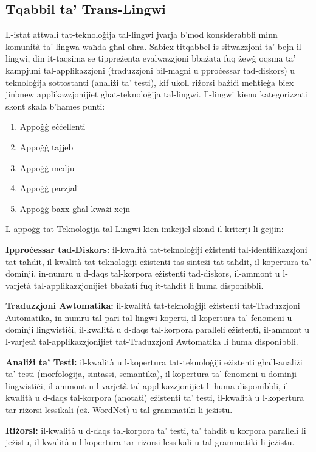 \documentclass[]{../../metanetpaper}
\begin{document}
\begin{multicols}{2}
\subsection{Tqabbil ta’ Trans-Lingwi }

L-istat attwali tat-teknoloġija tal-lingwi jvarja b’mod konsiderabbli minn komunità ta’ lingwa waħda għal oħra. Sabiex titqabbel is-sitwazzjoni ta’ bejn il-lingwi, din it-taqsima se tippreżenta evalwazzjoni bbażata fuq żewġ oqsma ta’ kampjuni tal-applikazzjoni (traduzzjoni bil-magni u pproċessar tad-diskors) u teknoloġija sottostanti (analiżi ta’ testi), kif ukoll riżorsi bażiċi meħtieġa biex jinbnew applikazzjonijiet għat-teknoloġija tal-lingwi. 
Il-lingwi kienu kategorizzati skont skala b'ħames punti:

\begin{enumerate}
\item Appoġġ eċċellenti
\item Appoġġ tajjeb
\item Appoġġ medju
\item Appoġġ parzjali
\item Appoġġ baxx għal kważi xejn
\end{enumerate}

L-appoġġ tat-Teknoloġija tal-Lingwi kien imkejjel skond il-kriterji li ġejjin:

\textbf{Ipproċessar tad-Diskors:} il-kwalità tat-teknoloġiji eżistenti tal-identifikazzjoni tat-taħdit, il-kwalità tat-teknoloġiji eżistenti tas-sinteżi tat-taħdit, il-kopertura ta' dominji, in-numru u d-daqs tal-korpora eżistenti tad-diskors, il-ammont u l-varjetà tal-applikazzjonijiet bbażati fuq it-taħdit li huma disponibbli.

\textbf{Traduzzjoni Awtomatika:} il-kwalità tat-teknoloġiji eżistenti tat-Traduzzjoni Automatika, in-numru tal-pari tal-lingwi koperti, il-kopertura ta' fenomeni u dominji lingwistiċi, il-kwalità u d-daqs tal-korpora paralleli eżistenti, il-ammont u l-varjetà tal-applikazzjonijiet tat-Traduzzjoni Awtomatika li huma disponibbli.

\textbf{Analiżi ta’ Testi:} il-kwalità u l-kopertura tat-teknoloġiji eżistenti għall-analiżi ta’ testi (morfoloġija, sintassi, semantika), il-kopertura ta' fenomeni u dominji lingwistiċi, il-ammont u l-varjetà tal-applikazzjonijiet li huma disponibbli, il-kwalità u d-daqs tal-korpora (anotati) eżistenti ta’ testi, il-kwalità u l-kopertura tar-riżorsi lessikali (eż. WordNet) u tal-grammatiki li jeżistu.

\textbf{Riżorsi:} il-kwalità u d-daqs tal-korpora ta’ testi, ta’ taħdit u korpora paralleli li jeżistu, il-kwalità u l-kopertura tar-riżorsi lessikali u tal-grammatiki li jeżistu.



\end{multicols}
\end{document}
